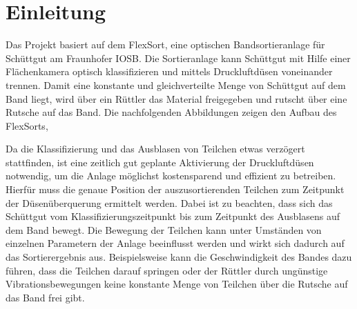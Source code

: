 \section{Einleitung}

Das Projekt basiert auf dem FlexSort, eine optischen Bandsortieranlage für Schüttgut am Fraunhofer IOSB. Die Sortieranlage kann Schüttgut mit Hilfe einer Flächenkamera optisch klassifizieren und mittels Druckluftdüsen voneinander trennen. Damit eine konstante und gleichverteilte Menge von Schüttgut auf dem Band liegt, wird über ein Rüttler das Material freigegeben und rutscht über eine Rutsche auf das Band. Die nachfolgenden Abbildungen zeigen den Aufbau des FlexSorts,

%


Da die Klassifizierung und das Ausblasen von Teilchen etwas verzögert stattfinden, ist eine zeitlich gut geplante Aktivierung der Druckluftdüsen notwendig, um die Anlage möglichst kostensparend und effizient zu betreiben. Hierfür muss die genaue Position der auszusortierenden Teilchen zum Zeitpunkt der Düsenüberquerung ermittelt werden. Dabei ist zu beachten, dass sich das Schüttgut vom Klassifizierungszeitpunkt bis zum Zeitpunkt des Ausblasens auf dem Band bewegt. Die Bewegung der Teilchen kann unter Umständen von einzelnen Parametern der Anlage beeinflusst werden und wirkt sich dadurch auf das Sortierergebnis aus. Beispielsweise kann die Geschwindigkeit des Bandes dazu führen, dass die Teilchen darauf springen oder der Rüttler durch ungünstige Vibrationsbewegungen keine konstante Menge von Teilchen über die Rutsche auf das Band frei gibt. 

